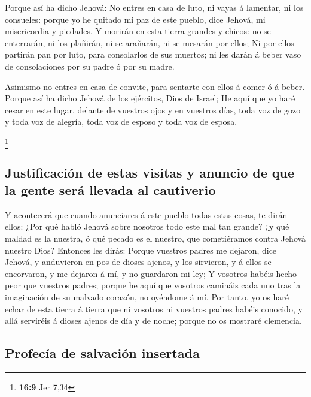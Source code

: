  Porque así ha dicho Jehová: No entres en casa de luto, ni
vayas á lamentar, ni los consueles: porque yo he quitado mi paz de este
pueblo, dice Jehová, mi misericordia y piedades.  Y morirán
en esta tierra grandes y chicos: no se enterrarán, ni los plañirán, ni
se arañarán, ni se mesarán por ellos;  Ni por ellos partirán
pan por luto, para consolarlos de sus muertos; ni les darán á beber vaso
de consolaciones por su padre ó por su madre.

 Asimismo no entres en casa de convite, para sentarte con
ellos á comer ó á beber.  Porque así ha dicho Jehová de los
ejércitos, Dios de Israel; He aquí que yo haré cesar en este lugar,
delante de vuestros ojos y en vuestros días, toda voz de gozo y toda voz
de alegría, toda voz de esposo y toda voz de esposa.

\footnote{\textbf{16:9} Jer 7,34}

\hypertarget{justificaciuxf3n-de-estas-visitas-y-anuncio-de-que-la-gente-seruxe1-llevada-al-cautiverio}{%
\subsection{Justificación de estas visitas y anuncio de que la gente
será llevada al
cautiverio}\label{justificaciuxf3n-de-estas-visitas-y-anuncio-de-que-la-gente-seruxe1-llevada-al-cautiverio}}

 Y acontecerá que cuando anunciares á este pueblo todas
estas cosas, te dirán ellos: ¿Por qué habló Jehová sobre nosotros todo
este mal tan grande? ¿y qué maldad es la nuestra, ó qué pecado es el
nuestro, que cometiéramos contra Jehová nuestro Dios? 
Entonces les dirás: Porque vuestros padres me dejaron, dice Jehová, y
anduvieron en pos de dioses ajenos, y los sirvieron, y á ellos se
encorvaron, y me dejaron á mí, y no guardaron mi ley;  Y
vosotros habéis hecho peor que vuestros padres; porque he aquí que
vosotros camináis cada uno tras la imaginación de su malvado corazón, no
oyéndome á mí.  Por tanto, yo os haré echar de esta tierra
á tierra que ni vosotros ni vuestros padres habéis conocido, y allá
serviréis á dioses ajenos de día y de noche; porque no os mostraré
clemencia.

\hypertarget{profecuxeda-de-salvaciuxf3n-insertada}{%
\subsection{Profecía de salvación
insertada}\label{profecuxeda-de-salvaciuxf3n-insertada}}

